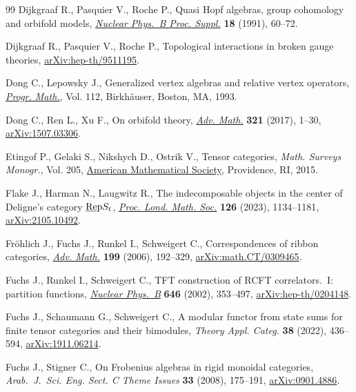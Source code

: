 \begin{thebibliography}{99}
Dijkgraaf R., Pasquier V., Roche P., Quasi {H}opf algebras, group cohomology
 and orbifold models, \href{https://doi.org/10.1016/0920-5632(91)90123-V}{\textit{Nuclear Phys.~B Proc. Suppl.}} \textbf{18}
 (1991), 60--72.

Dijkgraaf R., Pasquier V., Roche P., Topological interactions in broken gauge
 theories, \href{https://arxiv.org/abs/hep-th/9511195}{arXiv:hep-th/9511195}.

Dong C., Lepowsky J., Generalized vertex algebras and relative vertex
 operators, \href{https://doi.org/10.1007/978-1-4612-0353-7}{\textit{Progr. Math.}}, Vol. 112, Birkh\"{a}user, Boston, MA, 1993.

Dong C., Ren L., Xu F., On orbifold theory, \href{https://doi.org/10.1016/j.aim.2017.09.032}{\textit{Adv. Math.}} \textbf{321}
 (2017), 1--30, \href{https://arxiv.org/abs/1507.03306}{arXiv:1507.03306}.

Etingof P., Gelaki S., Nikshych D., Ostrik V., Tensor categories, \textit{Math.
 Surveys Monogr.}, Vol. 205, \href{https://doi.org/10.1090/surv/205}{American Mathematical Society}, Providence, RI,
 2015.

Flake J., Harman N., Laugwitz R., The indecomposable objects in the center of
 {D}eligne's category {$\underline{\rm Re}{\rm p}S_t$}, \href{https://doi.org/10.1112/plms.12509}{\textit{Proc. Lond.
 Math. Soc.}} \textbf{126} (2023), 1134--1181, \href{https://arxiv.org/abs/2105.10492}{arXiv:2105.10492}.

Fr\"ohlich J., Fuchs J., Runkel I., Schweigert C., Correspondences of ribbon
 categories, \href{https://doi.org/10.1016/j.aim.2005.04.007}{\textit{Adv. Math.}} \textbf{199} (2006), 192--329,
 \href{https://arxiv.org/abs/math.CT/0309465}{arXiv:math.CT/0309465}.

Fuchs J., Runkel I., Schweigert C., {TFT} construction of {RCFT}
 correlators.~{I}: partition functions, \href{https://doi.org/10.1016/S0550-3213(02)00744-7}{\textit{Nuclear Phys.~B}} \textbf{646}
 (2002), 353--497, \href{https://arxiv.org/abs/hep-th/0204148}{arXiv:hep-th/0204148}.

Fuchs J., Schaumann G., Schweigert C., A modular functor from state sums for
 finite tensor categories and their bimodules, \textit{Theory Appl. Categ.}
 \textbf{38} (2022), 436--594, \href{https://arxiv.org/abs/1911.06214}{arXiv:1911.06214}.

Fuchs J., Stigner C., On {F}robenius algebras in rigid monoidal categories,
 \textit{Arab.~J.~Sci. Eng. Sect. C Theme Issues} \textbf{33} (2008),
 175--191, \href{https://arxiv.org/abs/0901.4886}{arXiv:0901.4886}.


\end{thebibliography}
